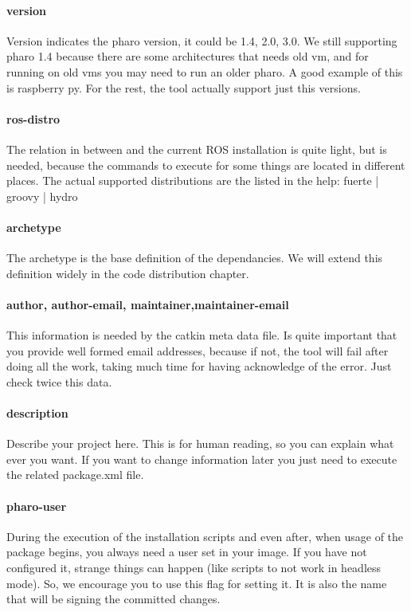 \documentclass[a4paper,10pt,twoside]{book}
\begin{document}
				\paragraph{version}
					Version indicates the pharo version, it could be 1.4, 2.0, 3.0. We still supporting pharo 1.4 because there are some architectures that needs old vm, and for running on old vms you may need to run an older pharo. A good example of this is raspberry py. For the rest, the tool actually support just this versions.
					
				\paragraph{ros-distro}
					The relation in between \fwkName{} and the current ROS installation is quite light, but is needed, because the commands to execute for some things are located in different places. The actual supported distributions are the listed in the help: {fuerte | groovy | hydro}
					
				\paragraph{archetype}
					The archetype is the base definition of the dependancies. We will extend this definition widely in the code distribution chapter.
					
				\paragraph{author, author-email, maintainer,maintainer-email}
					This information is needed by the catkin meta data file. Is quite important that you provide well formed email addresses, because if not, the tool will fail after doing all the work, taking much time for having acknowledge of the error. Just check twice this data.
				
				\paragraph{description}
					Describe your project here. This is for human reading, so you can explain what ever you want. If you want to change information later you just need to execute the related package.xml file.
				
				\paragraph{pharo-user}
					During the execution of the installation scripts and even after, when usage of the package begins, you always need a user set in your image. If you have not configured it, strange things can happen (like scripts to not work in headless mode). So, we encourage you to use this flag for setting it. It is also the name that will be signing the committed changes.
				
\end{document}
